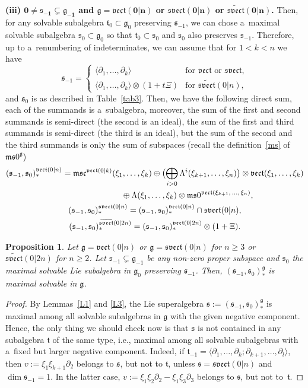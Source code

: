 \documentclass[pdftex]{sigma}
\newcommand{\del}{\partial}
\newcommand {\fc} {{\mathfrak{c}}}
\newcommand {\fg} {{\mathfrak{g}}} %
\newcommand {\fm} {{\mathfrak{m}}}
\newcommand {\fs} {{\mathfrak{s}}}
\newcommand {\fsvect} {{\mathfrak{svect}}}
\newcommand {\ft} {{\mathfrak{t}}}
\newcommand {\fvect} {{\mathfrak{vect}}} %
\newcommand {\<} [2] {{\left.\vphantom{#2}\right.^{#1\!}\!{#2}}}
\numberwithin{equation}{section}
\newtheorem{Proposition}[Theorem]{Proposition}
\begin{document}
{\bf (iii) $\boldsymbol{0\neq\fs_{-1}\subsetneq\fg_{-1}}$ and $\boldsymbol{\fg=\fvect(0|n)}$ or $\boldsymbol{\fsvect(0|n)}$ or $\boldsymbol{\widetilde\fsvect(0|n)}$.}
Then, for any solvable subalgebra $\ft_0\subset \fg_0$ preserving $\fs_{-1}$, we can chose a~maximal solvable subalgebra $\fs_0\subset \fg_0$ so that $\ft_0\subset \fs_0$ and $\fs_0$ also preserves $\fs_{-1}$. Therefore, up to a~renumbering of indeterminates, we can assume that for $1<k<n$ we have
\[
\fs_{-1}=\begin{cases}\langle \del_1,\dots, \del_k\rangle&\text{for $\fvect$ or $\fsvect$,}\\
\langle \del_1,\dots, \del_k\rangle\otimes (1+t\Xi)&\text{for $\widetilde\fsvect(0|n)$},
\end{cases}
\]
and $\fs_0$ is as described in Table~\ref{tab3}. Then, we have the following direct sum, each of the summands is a~subalgebra, moreover, the sum of the first and second summands is semi-direct (the second is an ideal), the sum of the first and third summands is semi-direct (the third is an ideal), but the sum of the second and the third summands is only the sum of subspaces (recall the definition~\eqref{ms} of $\fm\fs0^{\fg}$)
\begin{gather}
(\fs_{-1}, \fs_{0})_*^{\fvect(0|n)}= \fm\fs\fc^{\fvect(0|k)}(\xi_1,\dots,\xi_k)\oplus \bigl(\bigoplus_{i>0} \Lambda^i(\xi_{k+1},\dots,\xi_n)\bigr)\otimes \fvect(\xi_1,\dots,\xi_k) \nonumber\\
\hphantom{(\fs_{-1}, \fs_{0})_*^{\fvect(0|n)}=}{}
\oplus\Lambda(\xi_{1},\dots,\xi_k)\otimes \fm\fs0^{\fvect(\xi_{k+1},\, \dots, \, \xi_n)},\nonumber\\
(\fs_{-1}, \fs_{0})_*^{\fsvect(0|n)}= (\fs_{-1}, \fs_{0})_*^{\fvect(0|n)}\cap\fsvect(0|n),\nonumber\\
(\fs_{-1}, \fs_{0})_*^{\widetilde\fsvect(0|2n)}= (\fs_{-1}, \fs_{0})_*^{\fvect(0|2n)}\otimes(1+\Xi)\label{(**)}.
\end{gather}

\begin{Proposition}\label{P3} Let $\fg=\fvect(0|n)$ or $\fg=\fsvect(0|n)$ for $n\geq 3$ or $\widetilde{\fsvect}(0|2n)$ for $n\geq 2$. Let $\fs_{-1}\subsetneq\fg_{-1}$ be any non-zero proper subspace and $\fs_{0}$ the maximal solvable Lie subalgebra in $\fg_0$ preserving $\fs_{-1}$. Then, $(\fs_{-1}, \fs_0)_*^\fg$ is maximal solvable in $\fg$.
\end{Proposition}

\begin{proof}
By Lemmas~\ref{L1} and \ref{L3}, the Lie superalgebra $\fs:=(\fs_{-1}, \fs_0)_*^\fg$ is maximal among all solvable subalgebras in $\fg$ with the given negative component. Hence, the only thing we should check now is that $\fs$ is not contained in any subalgebra $\ft$ of the same type, i.e., maximal among all solvable subalgebras with a~fixed but larger negative component.
Indeed, if $\ft_{-1}=\langle \del_1,\dots,\del_k; \del_{k+1},\dots,\del_{l}\rangle $, then $v:=\xi_1\xi_{k+1}\del_2$ belongs to $\fs$, but not to $\ft$, unless $\fs=\fsvect(0|n)$ and $\dim\fs_{-1}=1$. In the latter case, ${v:=\xi_1\xi_{2}\del_2-\xi_1\xi_{3}\del_3}$ belongs to $\fs$, but not to~$\ft$.
\end{proof}
\end{document}
